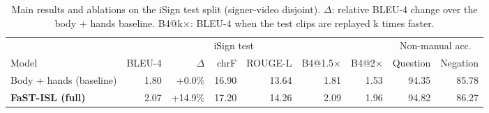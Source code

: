 \begin{table}[t]\centering\small
\begin{tabular}{lrrrrrrrr}\toprule
& \multicolumn{5}{c}{iSign test} & & \multicolumn{2}{c}{Non-manual acc.} \\
Model & BLEU-4 & $\Delta$ & chrF & ROUGE-L & B4@1.5$\times$ & B4@2$\times$ & Question & Negation \\
\midrule
Body + hands (baseline) & 1.80 & +0.0\% & 16.90 & 13.64 & 1.81 & 1.53 & 94.35 & 85.78 \\
\textbf{FaST-ISL (full)} & 2.07 & +14.9\% & 17.20 & 14.26 & 2.09 & 1.96 & 94.82 & 86.27 \\
\bottomrule\end{tabular}
\caption{Main results and ablations on the iSign test split (signer-video disjoint). $\Delta$: relative BLEU-4 change over the body + hands baseline. B4@k$\times$: BLEU-4 when the test clips are replayed k times faster.}
\label{tab:main}\end{table}
